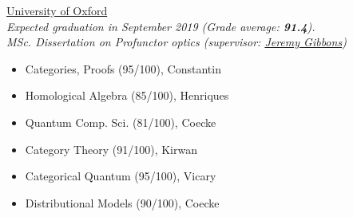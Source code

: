 \documentclass[nocolors]{friggeri-cv-a4}
\begin{document}
\begin{entrylist}


  {}
  {\href{https://www.ox.ac.uk/admissions/graduate/courses/msc-mathematics-and-foundations-computer-science?wssl=1}
    {\normalsize{University of Oxford}} \\ \emph{Expected graduation in September 2019 (Grade average: \textbf{91.4}). \\ MSc. Dissertation on Profunctor optics (supervisor: \href{https://www.cs.ox.ac.uk/people/jeremy.gibbons/}{Jeremy Gibbons})} {\scriptsize
    \begin{multicols}{2}
      \begin{itemize}[topsep=0pt]
      \item Categories, Proofs (95/100), Constantin
      \item Homological Algebra (85/100), Henriques
      \item Quantum Comp. Sci. (81/100), Coecke
      \item Category Theory (91/100), Kirwan
      \item Categorical Quantum (95/100), Vicary
      \item Distributional Models (90/100), Coecke
      \end{itemize}
    \end{multicols}
  }}
  

\end{entrylist}
\end{document}
